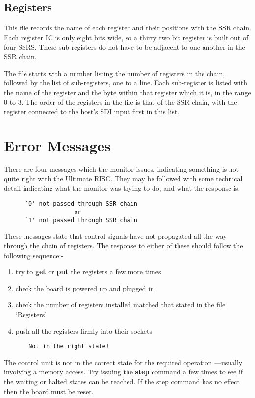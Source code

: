 \subsection{Registers}
This file records the name of each register and their positions with the SSR chain.
Each register IC is only eight bits wide, so a thirty two bit register is built out of four SSRS.
These sub-registers do not have to be adjacent to one another in the SSR chain.

The file starts with a number listing the number of registers in the chain,
followed by the list of sub-registers, one to a line.
Each sub-register is listed with the name of the register and the byte within that register which it is, in the range 0 to 3.
The order of the registers in the file is that of the SSR chain,
with the register connected to the host's SDI input first in this list.

\section{Error Messages}
There are four  messages which the monitor issues, indicating something
is not quite right with the Ultimate RISC.
They may be followed with some technical detail indicating what the monitor was trying to do, and what the response is.

{\samepage
\begin{verbatim}
      `0' not passed through SSR chain
                    or 
      `1' not passed through SSR chain
   \end{verbatim}
These messages state that control signals have not propagated all the way through the chain of registers.
The response to either of these should follow the following sequence:-
\begin{enumerate}
\item try to {\bf get} or {\bf put} the registers a few more times
\item check the board is powered up and plugged in
\item check the number of registers installed matched that stated in the file `Registers'
\item push all the registers firmly into their sockets 
\end{enumerate}
}

\begin{verbatim}
       Not in the right state!
\end{verbatim}
The control unit is not in the correct state for the required operation ---usually involving a memory access.
Try issuing the {\bf step} command a few times to see if the waiting or halted states can be reached.
If the step command has no effect then the board must be reset.

